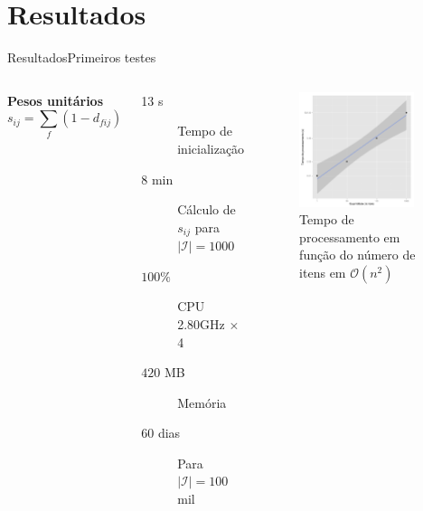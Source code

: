 \section[Resultados]{Resultados}

\begin{frame}{Resultados}{Primeiros testes}
\begin{columns}[c]
\textbf{Pesos unitários}
$$
    s_{ij} = \sum_{f}{\left(1-d_{fij}\right)}
$$
\begin{description}
	\item[13 s] Tempo de inicialização
	\item[8 min] Cálculo de $s_{ij}$ para $\left|\mathcal{I}\right| = 1000$
	\item[$100 \%$] CPU \\ 2.80GHz $\times$ 4
	\item[$420$ MB] Memória 
	\item[]
	\item[60 dias] Para $\left|\mathcal{I}\right| = 100$  mil
\end{description}	
\begin{figure}[ht]
    \begin{center}
    \includegraphics[width=0.9\textwidth]{img/ixt}
    \end{center}
\caption{Tempo de processamento em função do número de itens em $\mathcal{O}\left(n^2\right)$}
\end{figure}
\end{columns}
\end{frame}



